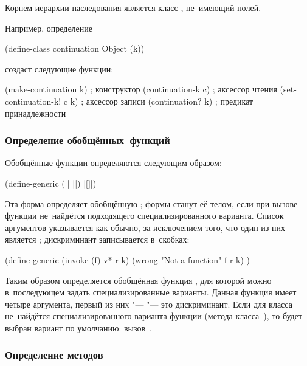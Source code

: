Корнем иерархии наследования является класс , не~имеющий полей.

Например, определение

\begin{code:lisp}
(define-class continuation Object (k))
\end{code:lisp}

\noindent
создаст следующие функции:

\begin{code:lisp}
(make-continuation k)         ; конструктор
(continuation-k c)            ; аксессор чтения
(set-continuation-k! c k)     ; аксессор записи
(continuation? k)             ; предикат принадлежности
\end{code:lisp}


\subsubsection{Определение обобщённых~функций}

Обобщённые функции определяются следующим образом:

\begin{code:lisp}
(define-generic (|| ||)
  |\textrm{$[$$]$}|)
\end{code:lisp}

Эта форма определяет обобщённую ; формы
 станут её телом, если при вызове функции
не~найдётся подходящего специализированного варианта. Список аргументов
указывается как обычно, за исключением того, что один из них является
; дискриминант записывается в~скобках:

\begin{code:lisp}
(define-generic (invoke (f) v* r k)
  (wrong "Not a function" f r k) )
\end{code:lisp}

Таким образом определяется обобщённая функция , для которой можно
в~последующем задать специализированные варианты. Данная функция имеет четыре
аргумента, первый из них "---  "--- это дискриминант. Если для
класса~ не~найдётся специализированного варианта функции (метода
класса~), то будет выбран вариант по умолчанию: вызов~.


\subsubsection{Определение методов}

